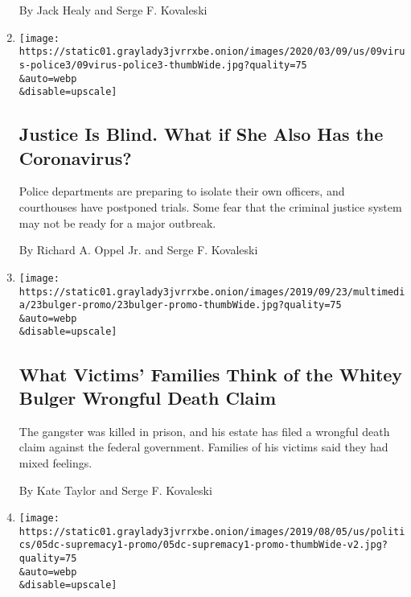 \begin{enumerate}
  By Jack Healy and Serge F. Kovaleski
\item
  \href{/2020/03/12/us/coronavirus-police-jails-courthouses.html}{}

  \texttt{[image: https://static01.graylady3jvrrxbe.onion/images/2020/03/09/us/09virus-police3/09virus-police3-thumbWide.jpg?quality=75\\\&auto=webp\\\&disable=upscale]}

  \hypertarget{justice-is-blind-what-if-she-also-has-the-coronavirus}{%
  \subsection{Justice Is Blind. What if She Also Has the
  Coronavirus?}\label{justice-is-blind-what-if-she-also-has-the-coronavirus}}

  Police departments are preparing to isolate their own officers, and
  courthouses have postponed trials. Some fear that the criminal justice
  system may not be ready for a major outbreak.

  By Richard A. Oppel Jr. and Serge F. Kovaleski
\item
  \href{/2019/09/23/us/whitey-bulger-wrongful-death.html}{}

  \texttt{[image: https://static01.graylady3jvrrxbe.onion/images/2019/09/23/multimedia/23bulger-promo/23bulger-promo-thumbWide.jpg?quality=75\\\&auto=webp\\\&disable=upscale]}

  \hypertarget{what-victims-families-think-of-the-whitey-bulger-wrongful-death-claim}{%
  \subsection{What Victims' Families Think of the Whitey Bulger Wrongful
  Death
  Claim}\label{what-victims-families-think-of-the-whitey-bulger-wrongful-death-claim}}

  The gangster was killed in prison, and his estate has filed a wrongful
  death claim against the federal government. Families of his victims
  said they had mixed feelings.

  By Kate Taylor and Serge F. Kovaleski
\item
  \href{/2019/08/05/us/politics/domestic-terrorism-shootings.html}{}

  \texttt{[image: https://static01.graylady3jvrrxbe.onion/images/2019/08/05/us/politics/05dc-supremacy1-promo/05dc-supremacy1-promo-thumbWide-v2.jpg?quality=75\\\&auto=webp\\\&disable=upscale]}

  \hypertarget{shootings-renew-debate-over-how-to-combat-domestic-terrorism}{%
}
\end{enumerate}
